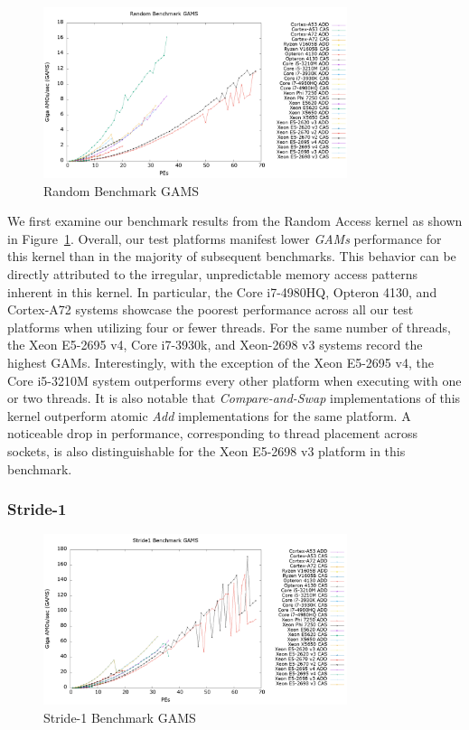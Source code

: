 \begin{figure}[!t]
\centering
\includegraphics[width=3.5in]{figures/RAND_GAMS.png}
\caption{Random Benchmark GAMS}
\label{fig:rand_gams}
\end{figure}

We first examine our benchmark results from the Random Access kernel as shown in Figure~\ref{fig:rand_gams}.
Overall, our test platforms manifest lower \textit{GAMs} performance for this kernel than in the majority of subsequent benchmarks.
This behavior can be directly attributed to the irregular, unpredictable memory access patterns inherent in this kernel.
In particular, the Core i7-4980HQ, Opteron 4130, and Cortex-A72 systems showcase the poorest performance across all our test platforms when utilizing four or fewer threads.
For the same number of threads, the Xeon E5-2695 v4, Core i7-3930k, and Xeon-2698 v3 systems record the highest GAMs.
Interestingly, with the exception of the Xeon E5-2695 v4, the Core i5-3210M system outperforms every other platform when executing with one or two threads.
It is also notable that \textit{Compare-and-Swap} implementations of this kernel outperform atomic \textit{Add} implementations for the same platform.
A noticeable drop in performance, corresponding to thread placement across sockets, is also distinguishable for the Xeon E5-2698 v3 platform in this benchmark.

\subsubsection{Stride-1}
\label{subsubsec:stride1_res}

\begin{figure}[!t]
\centering
\includegraphics[width=3.5in]{figures/STRIDE1_GAMS.png}
\caption{Stride-1 Benchmark GAMS}
\label{fig:s1_gams}
\end{figure}


